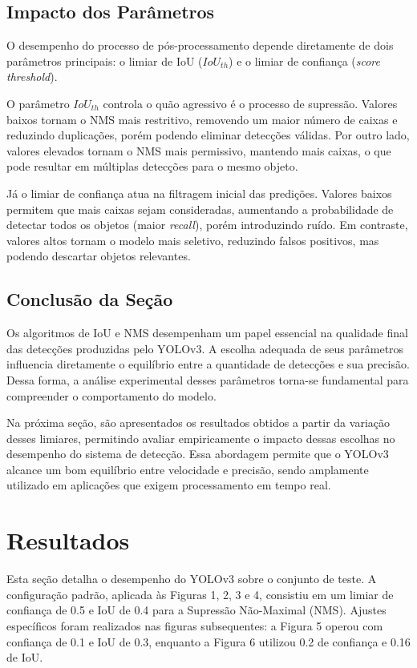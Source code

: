 \documentclass[conference]{IEEEtran}
\begin{document}
\subsection{Impacto dos Parâmetros}

O desempenho do processo de pós-processamento depende diretamente de dois parâmetros principais: o limiar de IoU ($IoU_{th}$) e o limiar de confiança (\textit{score threshold}).

O parâmetro $IoU_{th}$ controla o quão agressivo é o processo de supressão. Valores baixos tornam o NMS mais restritivo, removendo um maior número de caixas e reduzindo duplicações, porém podendo eliminar detecções válidas. Por outro lado, valores elevados tornam o NMS mais permissivo, mantendo mais caixas, o que pode resultar em múltiplas detecções para o mesmo objeto.

Já o limiar de confiança atua na filtragem inicial das predições. Valores baixos permitem que mais caixas sejam consideradas, aumentando a probabilidade de detectar todos os objetos (maior \textit{recall}), porém introduzindo ruído. Em contraste, valores altos tornam o modelo mais seletivo, reduzindo falsos positivos, mas podendo descartar objetos relevantes.

\subsection{Conclusão da Seção}

Os algoritmos de IoU e NMS desempenham um papel essencial na qualidade final das detecções produzidas pelo YOLOv3. A escolha adequada de seus parâmetros influencia diretamente o equilíbrio entre a quantidade de detecções e sua precisão. Dessa forma, a análise experimental desses parâmetros torna-se fundamental para compreender o comportamento do modelo.

Na próxima seção, são apresentados os resultados obtidos a partir da variação desses limiares, permitindo avaliar empiricamente o impacto dessas escolhas no desempenho do sistema de detecção.
Essa abordagem permite que o YOLOv3 alcance um bom equilíbrio entre velocidade e precisão, sendo amplamente utilizado em aplicações que exigem processamento em tempo real.

\section{Resultados}
Esta seção detalha o desempenho do YOLOv3 sobre o conjunto de teste. A configuração padrão, aplicada às Figuras 1, 2, 3 e 4, consistiu em um limiar de confiança de 0.5 e IoU de 0.4 para a Supressão Não-Maximal (NMS). Ajustes específicos foram realizados nas figuras subsequentes: a Figura 5 operou com confiança de 0.1 e IoU de 0.3, enquanto a Figura 6 utilizou 0.2 de confiança e 0.16 de IoU.
\end{document}
